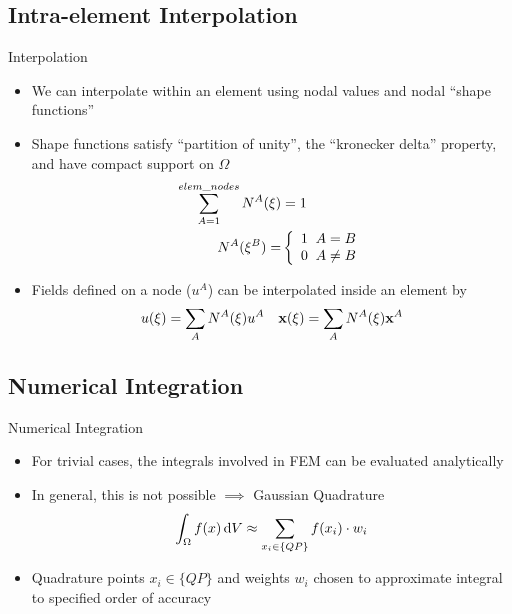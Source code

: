\subsection{Intra-element Interpolation}
\begin{frame}{Interpolation}

  \begin{itemize}
  \item
    We can interpolate within an element using nodal values
    and nodal ``shape functions''
  \item
    Shape functions satisfy ``partition of unity'', the ``kronecker delta'' property,
    and have compact support on $\Omega$
    \begin{align*}
      \sum_{A=1}^{elem\_nodes} N^A(\mathbf{\xi}) &= 1 \\
      N^A(\mathbf{\xi}^B) = &\left\{
      \begin{array}{c}
        1 \;\; A=B\\
        0 \;\; A\neq B
      \end{array}\right. \\
    \end{align*}
  \item
    Fields defined on a node ($u^A$) can be interpolated inside an element by
    \begin{align*}
      u(\xi) &= \sum_A N^A(\xi) u^A & \mathbf{x}(\xi) = \sum_A N^A(\xi) \mathbf{x}^A
    \end{align*}
  \end{itemize}

\end{frame}


\subsection{Numerical Integration}
\begin{frame}{Numerical Integration}
  \begin{itemize}
  \item
    For trivial cases, the integrals involved in FEM can be evaluated analytically
  \item
    In general, this is not possible  $\implies$ Gaussian Quadrature
    \begin{align*}
    \int_{\Omega} f(x) \,\mathrm{d}V \approx \sum_{x_i \in \{QP\}} f(x_i)\cdot w_i
    \end{align*}
  \item
    Quadrature points $x_i \in \{QP\}$ and weights $w_i$ chosen
    to approximate integral to specified order of accuracy
  \end{itemize}
\end{frame}

